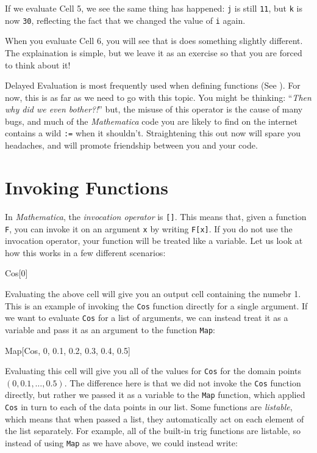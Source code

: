 If we evaluate Cell 5, we see the same thing has happened: \texttt{j} is still \texttt{11}, but \texttt{k} is now \texttt{30}, reflecting the fact that we changed the value of \texttt{i} again.

When you evaluate Cell 6, you will see that is does something slightly different. The explaination is simple, but we leave it as an exercise so that you are forced to think about it!

Delayed Evaluation is most frequently used when defining functions (See ). For now, this is as far as we need to go with this topic. You might be thinking: ``\emph{Then why did we even bother?!}'' but, the misuse of this operator is the cause of many bugs, and much of the \emph{Mathematica} code you are likely to find on the internet contains a wild \texttt{:=} when it shouldn't. Straightening this out now will spare you headaches, and will promote friendship between you and your code.

\section{Invoking Functions}

In \emph{Mathematica}, the \emph{invocation operator} is \texttt{[]}. This means that, given a function \texttt{F}, you can invoke it on an argument \texttt{x} by writing \texttt{F[x]}. If you do not use the invocation operator, your function will be treated like a variable. Let us look at how this works in a few different scenarios:

\begin{code}
	   Cos[0]
\end{code}

Evaluating the above cell will give you an output cell containing the numebr 1. This is an example of invoking the \texttt{Cos} function directly for a single argument. If we want to evaluate \texttt{Cos} for a list of arguments, we can instead treat it as a variable and pass it as an argument to the function \texttt{Map}:

\begin{code}
	   Map[Cos, {0, 0.1, 0.2, 0.3, 0.4, 0.5}]
\end{code}

Evaluating this cell will give you all of the values for \texttt{Cos} for the domain points $(0, 0.1, \dots, 0.5)$. The difference here is that we did not invoke the \texttt{Cos} function directly, but rather we passed it as a variable to the \texttt{Map} function, which applied \texttt{Cos} in turn to each of the data points in our list. 
Some functions are \emph{listable}, which means that when passed a list, they automatically act on each element of the list separately. For example, all of the built-in trig functions are listable, so instead of using \texttt{Map} as we have above, we could instead write:

